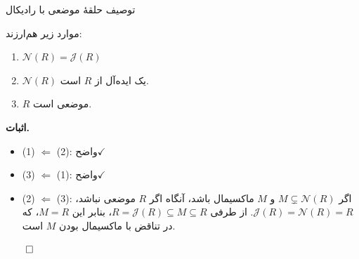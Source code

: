 \begin{frame}[t]{توصیف حلقهٔ موضعی با رادیکال}
    \begin{theorem}
        موارد زیر هم‌ارزند:
        \begin{enumerate}
            \item \(\mathcal{N}(R) = \mathcal{J}(R)\)
            \item \(\mathcal{N}(R)\) یک ایده‌آل از \(R\) است.
            \item \(R\) موضعی است.
        \end{enumerate}
    \end{theorem}

    \textbf{اثبات.}

        \begin{itemize}
            \item (1) $\Leftarrow$ (2):  واضح\(\checkmark\)
            \item (3) $\Leftarrow$ (1): واضح\( \checkmark\)
            \item (2) $\Leftarrow$ (3): اگر \( M \subsetneq \mathcal{N}(R) \) و \( M \) ماکسیمال باشد، آنگاه اگر \( R \) موضعی نباشد،
                  \( \mathcal{J}(R) = \mathcal{N}(R) = R\).
                  از طرفی
                  \(R = \mathcal{J}(R) \subseteq M \subseteq R\)،
                  بنابر این
                  \(M = R\)،
                  که در تناقض با ماکسیمال بودن
                  \(M\)
                  است.
        \end{itemize}

        \hfill \(\qed\)
\end{frame}